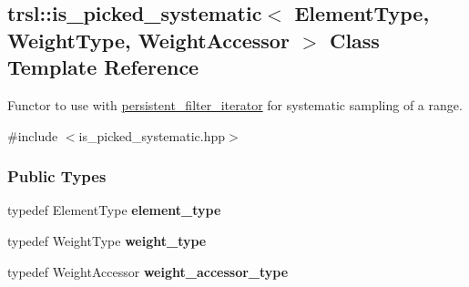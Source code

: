 \hypertarget{classtrsl_1_1is__picked__systematic}{
\subsection{trsl::is\_\-picked\_\-systematic$<$ ElementType, WeightType, WeightAccessor $>$ Class Template Reference}
\label{classtrsl_1_1is__picked__systematic}
}


Functor to use with \hyperlink{classtrsl_1_1persistent__filter__iterator}{persistent\_\-filter\_\-iterator} for systematic sampling of a range.  


{\ttfamily \#include $<$is\_\-picked\_\-systematic.hpp$>$}\subsubsection*{Public Types}
\begin{DoxyCompactItemize}
\item 
\hypertarget{classtrsl_1_1is__picked__systematic_a1f5e0255284dff2537b129fe9e3b619e}{
typedef ElementType {\bfseries element\_\-type}}
\label{classtrsl_1_1is__picked__systematic_a1f5e0255284dff2537b129fe9e3b619e}

\item 
\hypertarget{classtrsl_1_1is__picked__systematic_a5a0540f7315ffb38d8aec43e7c6f9bb4}{
typedef WeightType {\bfseries weight\_\-type}}
\label{classtrsl_1_1is__picked__systematic_a5a0540f7315ffb38d8aec43e7c6f9bb4}

\item 
\hypertarget{classtrsl_1_1is__picked__systematic_ae6d759df217dd322bbe88ee537eeeed0}{
typedef WeightAccessor {\bfseries weight\_\-accessor\_\-type}}
\label{classtrsl_1_1is__picked__systematic_ae6d759df217dd322bbe88ee537eeeed0}

\end{DoxyCompactItemize}
